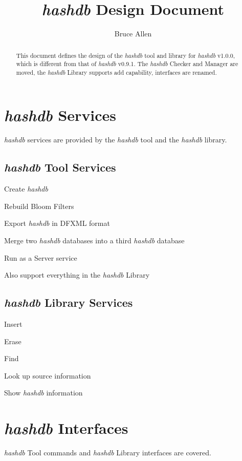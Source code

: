 \documentclass[12pt,twoside]{article}
\newcommand{\hdb}{\emph{hashdb}\xspace}
\begin{document}
\title{\hdb Design Document}
\author{Bruce Allen}
\maketitle

\begin{abstract}
This document defines the design of the \hdb tool and library
for \hdb v1.0.0, which is different from that of \hdb v0.9.1.
The \hdb Checker and Manager are moved,
the \hdb Library supports add capability,
interfaces are renamed.
\end{abstract}

\section{\hdb Services}
\hdb services are provided by the \hdb tool and the \hdb library.
\subsection{\hdb Tool Services}
\begin{compactitem}
\item Create \hdb
\item Rebuild Bloom Filters
\item Export \hdb in DFXML format
\item Merge two \hdb databases into a third \hdb database
\item Run as a Server service
\item Also support everything in the \hdb Library
\end{compactitem}

\subsection{\hdb Library Services}
\begin{compactitem}
\item Insert
\item Erase
\item Find
\item Look up source information
\item Show \hdb information
\end{compactitem}

\section{\hdb Interfaces}
\hdb Tool commands and \hdb Library interfaces are covered.
\end{document}
